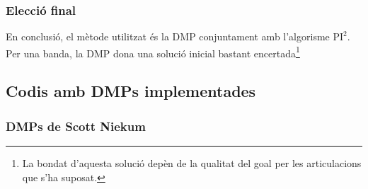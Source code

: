 \documentclass[12pt,a4paper,final,twoside]{article}
\begin{document}

\subsubsection{Elecció final}
En conclusió, el mètode utilitzat és la DMP conjuntament amb l'algorisme $\mathrm{PI^2}$. Per una banda, la DMP dona una solució inicial bastant encertada\footnote{La bondat d'aquesta solució depèn de la qualitat del goal per les articulacions que s'ha suposat.}


\subsection{Codis amb DMPs implementades}


\subsubsection{DMPs de Scott Niekum}
\end{document}
